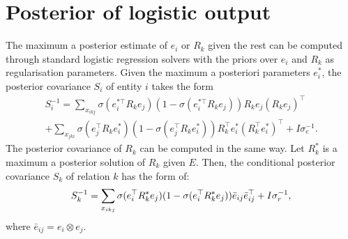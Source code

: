 \section{Posterior of logistic output}
\label{sec:posterior_logistic}
The maximum a posterior estimate of $e_i$ or $R_k$ given the rest can be computed through
standard logistic regression solvers with the priors over $e_i$ and $R_k$ as regularisation parameters. Given the
maximum a posteriori parameters $e_i^*$, the posterior covariance $S_i$ of entity
$i$ takes the form
\begin{align*}
S_i^{-1} = \sum_{x_{ikj}} \sigma(e_{i}^{*\top} R_k e_{j}) (1 - \sigma(e_{i}^{*\top} R_k e_{j})) R_k
e_{j}(R_k e_{j})^\top\\
 + \sum_{x_{jki}} \sigma(e_{j}^{\top} R_k e_{i}^*) ( 1- \sigma(e_{j}^{\top} R_k e_{i}^*)) R_k^\top e^*_{i}(R_k^\top e^*_{i})^\top + I\sigma_e^{-1}
.
\end{align*}
The posterior covariance of $R_k$ can be computed in the same way. Let $R_k^*$ is a maximum a posterior solution of $R_k$ given $E$. Then, the conditional posterior covariance $S_k$ of relation $k$ has the form of:
\begin{align}
S_k^{-1} = \sum_{x_{ikj}} \sigma(e_{i}^{\top} R_k^* e_{j}) (1 - \sigma(e_{i}^{\top} R_k^* e_{j}))
\bar{e}_{ij}\bar{e}_{ij}^\top + I\sigma_r^{-1}, \notag
\end{align}
where $\bar{e}_{ij} = e_i \otimes e_j$.

